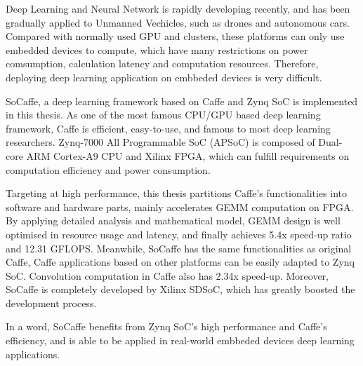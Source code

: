\begin{eabstract}
Deep Learning and Neural Network is rapidly developing recently, and has been gradually applied to Unmanned Vechicles, such as drones and autonomous cars. Compared with normally used GPU and clusters, these platforms can only use embedded devices to compute, which have many restrictions on power comsumption, calculation latency and computation resources. Therefore, deploying deep learning application on embbeded devices is very difficult.

SoCaffe, a deep learning framework based on Caffe and Zynq SoC is implemented in this thesis. As one of the most famous CPU/GPU based deep learning framework, Caffe is efficient, easy-to-use, and famous to most deep learning researchers. Zynq-7000 All Programmable SoC (APSoC) is composed of Dual-core ARM Cortex-A9 CPU and Xilinx FPGA, which can fulfill requirements on computation efficiency and power consumption.

Targeting at high performance, this thesis partitions Caffe's functionalities into software and hardware parts, mainly accelerates GEMM computation on FPGA. By applying detailed analysis and mathematical model, GEMM design is well optimised in resource usage and latency, and finally achieves 5.4x speed-up ratio and 12.31 GFLOPS. Meanwhile, SoCaffe has the same functionalities as original Caffe, Caffe applications based on other platforms can be easily adapted to Zynq SoC. Convolution computation in Caffe also has 2.34x speed-up. Moreover, SoCaffe is completely developed by Xilinx SDSoC, which has greatly boosted the development process.

In a word, SoCaffe benefits from Zynq SoC's high performance and Caffe's efficiency, and is able to be applied in real-world embbeded devices deep learning applications.

\end{eabstract}

